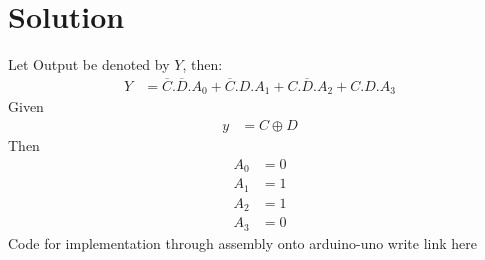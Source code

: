 \documentclass[journal,12pt,onecolumn]{IEEEtran}
\theoremstyle{remark}
\begin{document}
\section{Solution}
Let Output be denoted by $Y$, then:
\begin{align}
    Y &= \overline{C}.\overline{D}.A_{0} + \overline{C}.D.A_{1} + C.\overline{D}.A_{2} + C.D.A_{3}
\end{align}
Given \begin{align}
    y &= C\oplus D
\end{align}
Then
\begin{align}
    A_0&=0\\
    A_1&=1\\
    A_2&=1\\
    A_3&=0
\end{align}
Code for implementation through assembly onto arduino-uno
write link here
 
\end{document}

